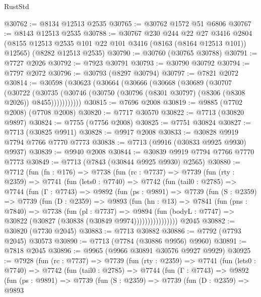 \begin{lexlean}{RustStd}
\begin{coremodule}
@30762 := @8134 @12513 @2535
@30765 := @30762 @1572 @51 @6806
@30767 := @8143 @12513 @2535
@30788 := @30767
    @230
    @244
    @22
    @27
    @3416
    @2804
    (@8155 @12513 @2535 @101 @22 @101 @3416 (@8163 (@8164 @12513 @101)) @12565)
    (@8282 @12513 @2535)
@30790 := @30760 (@30765 @30788)
@30791 := @7727 @2026
@30792 := @7923 @30791
@30793 := @30790 @30792
@30794 := @7797 @2072
@30796 := @30793 (@8297 @30794)
@30797 := @7821 @2072
@30814 := @30598
    (@30623
      (@30664
        (@30666
          (@30668
            (@30689
              (@30707
                (@30722
                  (@30735
                    (@30746 (@30750 (@30796 (@8301 @30797) (@8306 (@8308 @2026)) @8455)))))))))))
@30815 := @7696 @2008
@30819 := @9885 (@7702 @2008) (@7708 @2008)
@30820 := @7717 @30570
@30822 := @7713 (@30820 @9897)
@30824 := @7755 (@7756 @2008)
@30825 := @7751 @30824
@30827 := @7713 (@30825 @9911)
@30828 := @9917 @2008
@30833 := @30828 @9919 @7794 @7766 @7770 @7773
@30838 := @7713 (@9916 (@30833 @9925 @9930) @9937)
@30839 := @9940 @2008
@30844 := @30839 @9919 @7794 @7766 @7770 @7773
@30849 := @7713 (@7843 (@30844 @9925 @9930) @2565)
@30880 := @7712
    (fun (fn : @176) =>
    @7738
      (fun (rc : @7737) =>
      @7739
        (fun (rty : @2359) =>
        @7741
          (fun (lets0 : @7740) =>
          @7742
            (fun (tail0 : @2785) =>
            @7744
              (fun (Γ : @7743) =>
              @9892
                (fun (ps : @9891) =>
                @7739
                  (fun (S : @2359) =>
                  @7739
                    (fun (D : @2359) =>
                    @9893
                      (fun (hn : @13) =>
                      @7841
                        (fun (pns : @7840) =>
                        @7738
                          (fun (pl : @7737) =>
                          @9894
                            (fun (bodyL : @7747) =>
                            @30822 (@30827 (@30838 (@30849 @9974))))))))))))))))
    @2045
@30882 := @30820 (@7730 @2045)
@30883 := @7713 @30882
@30886 := @7792 (@7793 @2045) @30573
@30890 := @7713 (@7784 (@30886 @9956) @9960)
@30891 := @7818 @2045
@30896 := @9965 (@9966 @30891 @30576 @9927 @9929)
@30925 := @7928
    (fun (rc : @7737) =>
    @7739
      (fun (rty : @2359) =>
      @7741
        (fun (lets0 : @7740) =>
        @7742
          (fun (tail0 : @2785) =>
          @7744
            (fun (Γ : @7743) =>
            @9892
              (fun (ps : @9891) =>
              @7739
                (fun (S : @2359) =>
                @7739
                  (fun (D : @2359) =>
                  @9893

\end{coremodule}
\end{lexlean}
